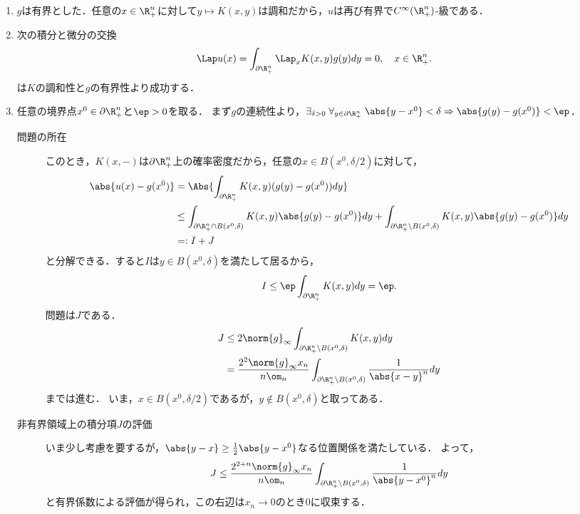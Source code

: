 \documentclass[uplatex,dvipdfmx]{jsreport}
\begin{document}
\begin{Proof}\mbox{}
    \begin{enumerate}
        \item $g$は有界とした．任意の$x\in\R^n_+$に対して$y\mapsto K(x,y)$は調和だから，$u$は再び有界で$C^\infty(\R^n_+)$-級である．
        \item 次の積分と微分の交換
        \[\Lap u(x)=\int_{\partial\R^n_+}\Lap_xK(x,y)g(y)dy=0,\quad x\in \R^n_+.\]
        は$K$の調和性と$g$の有界性より成功する．
        \item 任意の境界点$x^0\in\partial\R^n_+$と$\ep>0$を取る．
        まず$g$の連続性より，$\exists_{\delta>0}\;\forall_{y\in\partial\R^n_+}\;\abs{y-x^0}<\delta\Rightarrow\abs{g(y)-g(x^0)}<\ep$．
        \begin{description}
            \item[問題の所在] 
            このとき，$K(x,-)$は$\partial\R^n_+$上の確率密度だから，任意の$x\in B(x^0,\delta/2)$に対して，
            \begin{align*}
                \abs{u(x)-g(x^0)}&=\Abs{\int_{\partial\R^n_+}K(x,y)(g(y)-g(x^0))dy}\\
                &\le\int_{\partial\R^n_+\cap B(x^0,\delta)}K(x,y)\abs{g(y)-g(x^0)}dy+\int_{\partial\R^n_+\setminus B(x^0,\delta)}K(x,y)\abs{g(y)-g(x^0)}dy\\
                &=:I+J
            \end{align*}
            と分解できる．すると$I$は$y\in B(x^0,\delta)$を満たして居るから，
            \[I\le\ep\int_{\partial\R^n_+}K(x,y)dy=\ep.\]
            問題は$J$である．
            \begin{align*}
                J&\le2\norm{g}_\infty\int_{\partial\R^n_+\setminus B(x^0,\delta)}K(x,y)dy\\
                &=\frac{2^2\norm{g}_\infty x_n}{n\om_n}\int_{\partial\R^n_+\setminus B(x^0,\delta)}\frac{1}{\abs{x-y}^n}dy
            \end{align*}
            までは進む．
            いま，$x\in B(x^0,\delta/2)$であるが，$y\notin B(x^0,\delta)$と取ってある．
            \item[非有界領域上の積分項$J$の評価] いま少し考慮を要するが，$\abs{y-x}\ge\frac{1}{2}\abs{y-x^0}$なる位置関係を満たしている．
            よって，
            \[J\le\frac{2^{2+n}\norm{g}_\infty x_n}{n\om_n}\int_{\partial\R^n_+\setminus B(x^0,\delta)}\frac{1}{\abs{y-x^0}^n}dy\]
            と有界係数による評価が得られ，この右辺は$x_n\to0$のとき$0$に収束する．
        \end{description}
    \end{enumerate}
\end{Proof}
\end{document}
